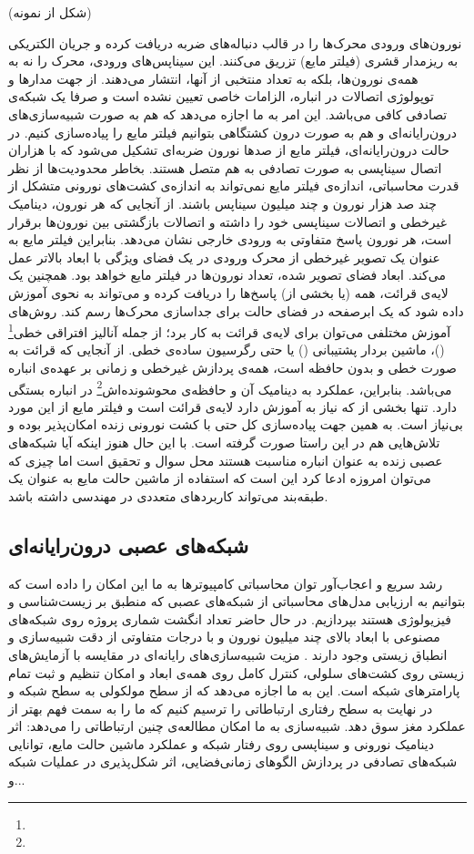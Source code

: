 (شکل از  نمونه)

نورون‌های ورودی محرک‌ها را در قالب دنباله‌های ضربه دریافت کرده و جریان الکتریکی به ریزمدار قشری (فیلتر مایع) تزریق می‌کنند. این سیناپس‌های ورودی، محرک را نه به همه‌ی نورون‌ها، بلکه به تعداد منتخبی از آنها، انتشار می‌دهند. از جهت مدارها و توپولوژی اتصالات در انباره، الزامات خاصی تعیین نشده است و صرفا یک شبکه‌ی تصادفی کافی می‌باشد. این امر به ما اجازه می‌دهد که هم به صورت شبیه‌سازی‌های درون‌رایانه‌ای و هم به صورت درون کشتگاهی بتوانیم فیلتر مایع را پیاده‌سازی کنیم. در حالت درون‌رایانه‌ای، فیلتر مایع از صدها نورون ضربه‌ای تشکیل می‌شود که با هزاران اتصال سیناپسی به صورت تصادفی به هم متصل هستند. بخاطر محدودیت‌ها از نظر قدرت محاسباتی، اندازه‌ی فیلتر مایع نمی‌تواند به اندازه‌ی کشت‌های نورونی متشکل از چند صد هزار نورون و چند میلیون سیناپس باشند. از آنجایی که هر نورون، دینامیک غیرخطی و اتصالات سیناپسی خود را داشته و اتصالات بازگشتی بین نورون‌ها برقرار است، هر نورون پاسخ متفاوتی به ورودی خارجی نشان می‌دهد. بنابراین فیلتر مایع به عنوان یک تصویر غیرخطی از محرک ورودی در یک فضای ویژگی با ابعاد بالاتر عمل می‌کند. ابعاد فضای تصویر شده، تعداد نورون‌ها در فیلتر مایع خواهد بود. همچنین یک لایه‌ی قرائت، همه (یا بخشی از) پاسخ‌ها را دریافت کرده و می‌تواند به نحوی آموزش داده شود که یک ابرصفحه در فضای حالت برای جداسازی محرک‌ها رسم کند. روش‌های آموزش مختلفی می‌توان برای لایه‌ی قرائت به کار برد؛ از جمله آنالیز افتراقی خطی\footnote{} ()، ماشین بردار پشتیبانی () یا حتی رگرسیون ساده‌ی خطی. از آنجایی که قرائت به صورت خطی و بدون حافظه است، همه‌ی پردازش غیرخطی و زمانی بر عهده‌ی انباره می‌باشد. بنابراین، عملکرد  به دینامیک آن و حافظه‌ی محوشونده‌اش\footnote{} در انباره بستگی دارد. تنها بخشی از  که نیاز به آموزش دارد لایه‌ی قرائت است و فیلتر مایع از این مورد بی‌نیاز است. به همین جهت پیاده‌سازی کل  حتی با کشت نورونی زنده امکان‌پذیر بوده و تلاش‌هایی هم در این راستا صورت گرفته است. با این حال هنوز اینکه آیا شبکه‌های عصبی زنده به عنوان انباره مناسبت هستند محل سوال و تحقیق است اما چیزی که می‌توان امروزه ادعا کرد این است که استفاده از ماشین حالت مایع به عنوان یک طبقه‌بند می‌تواند کاربردهای متعددی در مهندسی داشته باشد.

\subsection{شبکه‌های عصبی درون‌رایانه‌ای}
رشد سریع و اعجاب‌آور توان محاسباتی کامپیوتر‌ها به ما این امکان را داده است که بتوانیم به ارزیابی مدل‌های محاسباتی از شبکه‌های عصبی که منطبق بر زیست‌شناسی و فیزیولوژی هستند بپردازیم. در حال حاضر تعداد انگشت شماری پروژه روی شبکه‌های مصنوعی با ابعاد بالای چند میلیون نورون و با درجات متفاوتی از دقت شبیه‌سازی و انطباق زیستی وجود دارند \cite{eliasmith2012large,markram2006blue}. مزیت شبیه‌سازی‌های رایانه‌ای در مقایسه با آزمایش‌های زیستی روی کشت‌های سلولی، کنترل کامل روی همه‌ی ابعاد و امکان تنظیم و ثبت تمام پارامتر‌های شبکه است. این به ما اجازه می‌دهد که از سطح مولکولی به سطح شبکه و در نهایت به سطح رفتاری ارتباطاتی را ترسیم کنیم که ما را به سمت فهم بهتر از عملکرد مغز سوق دهد. شبیه‌سازی  به ما امکان مطالعه‌ی چنین ارتباطاتی را می‌دهد: اثر دینامیک نورونی و سیناپسی روی رفتار شبکه و عملکرد ماشین حالت مایع، توانایی شبکه‌های تصادفی در پردازش الگوهای زمانی‌فضایی، اثر شکل‌پذیری در عملیات شبکه و...

